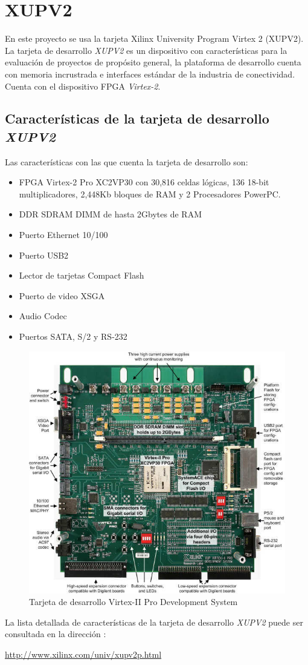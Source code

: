 \section{XUPV2}

En este proyecto se usa la tarjeta Xilinx University Program Virtex 2 (XUPV2).
La tarjeta de desarrollo \emph{XUPV2} es un dispositivo con características
para la evaluación de proyectos de  propósito general, la plataforma de
desarrollo cuenta con memoria incrustrada e interfaces estándar de la industria
de conectividad. Cuenta con el dispositivo FPGA \emph{Virtex-2}.

\subsection{Características de la  tarjeta de desarrollo \emph{XUPV2} }

Las características con las que cuenta la tarjeta de desarrollo son:

\begin{itemize}
\item FPGA Virtex-2 Pro XC2VP30  con 30,816 celdas lógicas, 136 18-bit multiplicadores,
 2,448Kb bloques de RAM y 2 Procesadores PowerPC.
\item DDR SDRAM DIMM de hasta  2Gbytes de RAM
\item Puerto Ethernet 10/100
\item Puerto USB2 
\item Lector de tarjetas Compact Flash
\item Puerto de video XSGA
\item Audio Codec
\item Puertos SATA, S/2 y RS-232
\end{itemize}


\begin{figure}[h!]
 \centering
 \includegraphics{./figuras/V2.jpg}
  \caption{Tarjeta de desarrollo Virtex-II Pro Development System}
 \label{XUPV502}
\end{figure}


La lista detallada de características de la tarjeta de desarrollo \emph{XUPV2}
puede ser consultada en la dirección : 
\begin{center}
 \url{http://www.xilinx.com/univ/xupv2p.html}
\end{center}
